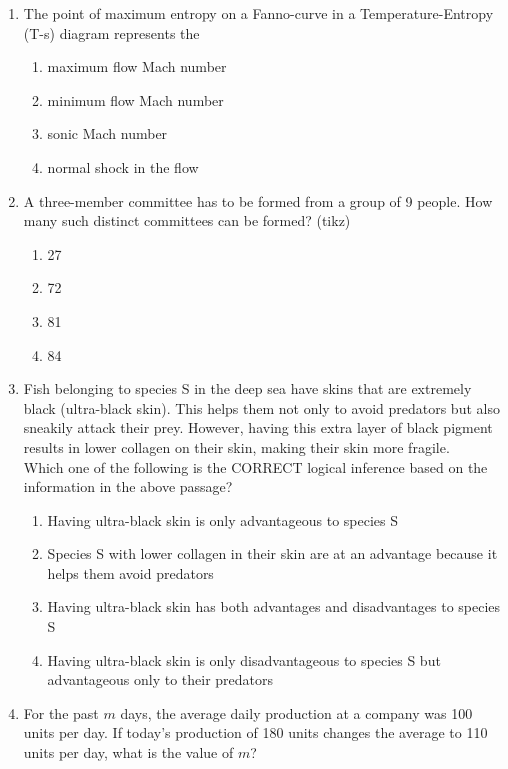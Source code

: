 \documentclass[journal]{IEEEtran}
\begin{document}
\begin{enumerate}
    \item {
    	The point of maximum entropy on a Fanno-curve in a Temperature-Entropy (T-s)
    	diagram represents the 
    	\begin{multicols}{2}
	    	\begin{enumerate}
	    		\item maximum flow Mach number
	    		\item minimum flow Mach number
	    		\item sonic Mach number
	    		\item normal shock in the flow 
	    	\end{enumerate}
	    \end{multicols}
    
    }    
    \item {A three-member committee has to be formed from a group of 9 people. How many such distinct committees can be formed? (tikz)
    	\begin{multicols}{4}
	    	\begin{enumerate}
	    		\item 27
	    		\item 72
	    		\item 81
	    		\item 84
	    	\end{enumerate}
    	\end{multicols}}
    \item {
    	Fish belonging to species S in the deep sea have skins that are extremely black
    	(ultra-black skin). This helps them not only to avoid predators but also sneakily
    	attack their prey. However, having this extra layer of black pigment results in
    	lower collagen on their skin, making their skin more fragile. \\
    	Which one of the following is the CORRECT logical inference based on the
    	information in the above passage? 
    		\begin{enumerate}
    			\item Having ultra-black skin is only advantageous to species S
    			\item Species S with lower collagen in their skin are at an advantage because it helps
    			them avoid predators
    			\item Having ultra-black skin has both advantages and disadvantages to species S
    			\item Having ultra-black skin is only disadvantageous to species S but advantageous
    			only to their predators 
    		\end{enumerate}
	}
    \item {
    	For the past $m$ days, the average daily production at a company was 100 units
    	per day.
    	If today’s production of 180 units changes the average to 110 units per day,
    	what is the value of $m$? 
    	
}
\end{enumerate}
\end{document}
